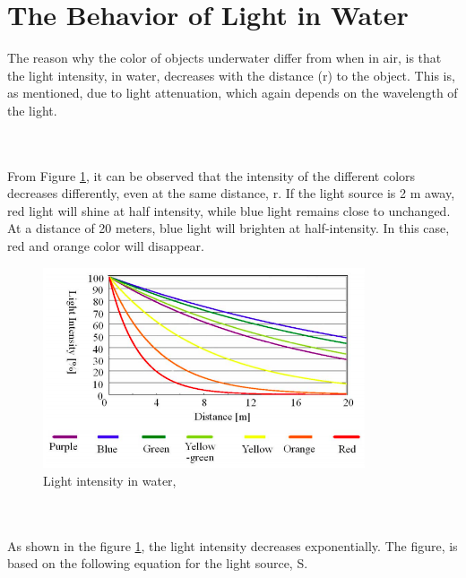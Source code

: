 \section{The Behavior of Light in Water}\label{lightinwater}
The reason why the color of objects underwater differ from when in air, is that the light intensity, in water, decreases with the distance (r) to the object. This is, as mentioned, due to light attenuation, which again depends on the wavelength of the light. \cite{yamashita_fujii_kaneko_2007_2}

\\\\
\noindent
From Figure \ref{fig:lightinwater}, it can be observed that the intensity of the different colors decreases differently, even at the same distance, r. If the light source is 2 m away, red light will shine at half intensity, while blue light remains close to unchanged. At a distance of 20 meters, blue light will brighten at half-intensity. In this case, red and orange color will disappear. \cite{yamashita_fujii_kaneko_2007}
\begin{figure}[H]
\centering
  \includegraphics[width=9.5cm]{Images/theory/intensity.png}
  \caption[Light Intensity in Water]{Light intensity in water, \cite{yamashita_fujii_kaneko_2007}}
  \label{fig:lightinwater}
\end{figure}
\\\\
\noindent
As shown in the figure \ref{fig:lightinwater}, the light intensity decreases exponentially. The figure, is based on the following equation for the light source, S. 

